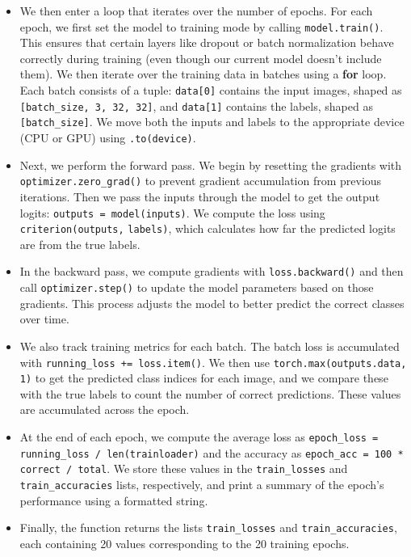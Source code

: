 \documentclass[a4paper,12pt]{article}
\begin{document}
\begin{itemize}
\begin{itemize}
        \item We then enter a loop that iterates over the number of epochs. For each epoch, we first set the model to training mode by calling \verb|model.train()|. This ensures that certain layers like dropout or batch normalization behave correctly during training (even though our current model doesn’t include them). We then iterate over the training data in batches using a \textbf{for} loop. Each batch consists of a tuple: \verb|data[0]| contains the input images, shaped as \verb|[batch_size, 3, 32, 32]|, and \verb|data[1]| contains the labels, shaped as \verb|[batch_size]|. We move both the inputs and labels to the appropriate device (CPU or GPU) using \verb|.to(device)|.
        
        \item Next, we perform the forward pass. We begin by resetting the gradients with \verb|optimizer.zero_grad()| to prevent gradient accumulation from previous iterations. Then we pass the inputs through the model to get the output logits: \verb|outputs = model(inputs)|. We compute the loss using \verb|criterion(outputs,| \verb|labels)|, which calculates how far the predicted logits are from the true labels.
        
        \item In the backward pass, we compute gradients with \verb|loss.backward()| and then call \verb|optimizer.step()| to update the model parameters based on those gradients. This process adjusts the model to better predict the correct classes over time.
        
        \item We also track training metrics for each batch. The batch loss is accumulated with \verb|running_loss += loss.item()|. We then use \verb|torch.max(outputs.data, 1)| to get the predicted class indices for each image, and we compare these with the true labels to count the number of correct predictions. These values are accumulated across the epoch.
        
        \item At the end of each epoch, we compute the average loss as \verb|epoch_loss = | \\ \verb|running_loss / len(trainloader)| and the accuracy as \verb|epoch_acc = 100 * | \\ \verb|correct / total|. We store these values in the \verb|train_losses| and \verb|train_accuracies| lists, respectively, and print a summary of the epoch’s performance using a formatted string.
        
        \item Finally, the function returns the lists \verb|train_losses| and \verb|train_accuracies|, each containing 20 values corresponding to the 20 training epochs.
    \end{itemize}
    
\end{itemize}
\newpage
\end{document}
